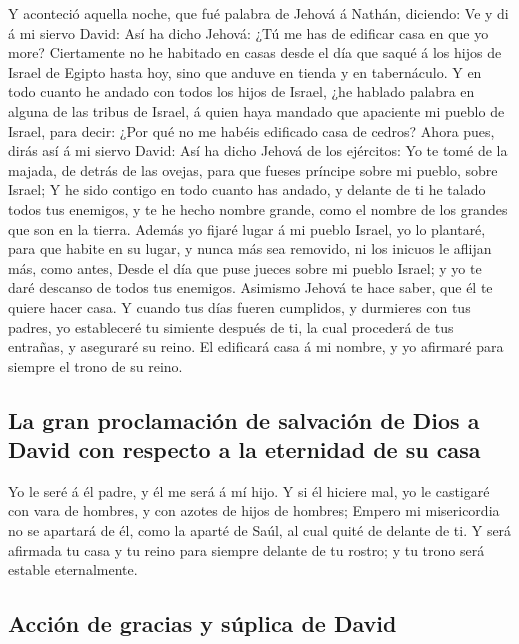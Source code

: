  Y aconteció aquella noche, que fué palabra de Jehová á
Nathán, diciendo:  Ve y di á mi siervo David: Así ha dicho
Jehová: ¿Tú me has de edificar casa en que yo more? 
Ciertamente no he habitado en casas desde el día que saqué á los hijos
de Israel de Egipto hasta hoy, sino que anduve en tienda y en
tabernáculo.  Y en todo cuanto he andado con todos los hijos
de Israel, ¿he hablado palabra en alguna de las tribus de Israel, á
quien haya mandado que apaciente mi pueblo de Israel, para decir: ¿Por
qué no me habéis edificado casa de cedros?  Ahora pues,
dirás así á mi siervo David: Así ha dicho Jehová de los ejércitos: Yo te
tomé de la majada, de detrás de las ovejas, para que fueses príncipe
sobre mi pueblo, sobre Israel;  Y he sido contigo en todo
cuanto has andado, y delante de ti he talado todos tus enemigos, y te he
hecho nombre grande, como el nombre de los grandes que son en la tierra.
 Además yo fijaré lugar á mi pueblo Israel, yo lo plantaré,
para que habite en su lugar, y nunca más sea removido, ni los inicuos le
aflijan más, como antes,  Desde el día que puse jueces
sobre mi pueblo Israel; y yo te daré descanso de todos tus enemigos.
Asimismo Jehová te hace saber, que él te quiere hacer casa.
 Y cuando tus días fueren cumplidos, y durmieres con tus
padres, yo estableceré tu simiente después de ti, la cual procederá de
tus entrañas, y aseguraré su reino.  El edificará casa á mi
nombre, y yo afirmaré para siempre el trono de su reino.

\hypertarget{la-gran-proclamaciuxf3n-de-salvaciuxf3n-de-dios-a-david-con-respecto-a-la-eternidad-de-su-casa}{%
\subsection{La gran proclamación de salvación de Dios a David con
respecto a la eternidad de su
casa}\label{la-gran-proclamaciuxf3n-de-salvaciuxf3n-de-dios-a-david-con-respecto-a-la-eternidad-de-su-casa}}

 Yo le seré á él padre, y él me será á mí hijo. Y si él
hiciere mal, yo le castigaré con vara de hombres, y con azotes de hijos
de hombres;  Empero mi misericordia no se apartará de él,
como la aparté de Saúl, al cual quité de delante de ti.  Y
será afirmada tu casa y tu reino para siempre delante de tu rostro; y tu
trono será estable eternalmente.

\hypertarget{acciuxf3n-de-gracias-y-suxfaplica-de-david}{%
\subsection{Acción de gracias y súplica de
David}\label{acciuxf3n-de-gracias-y-suxfaplica-de-david}}

